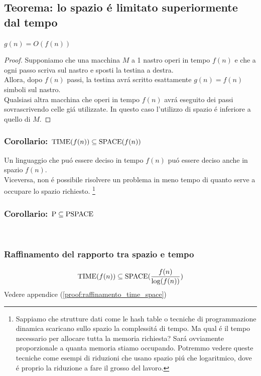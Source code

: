 \subsection{Teorema: lo spazio é limitato superiormente dal tempo}
\label{teorema:spazio_limitato_superiormente_dal_tempo}
{$g(n) = O(f(n))$}
\begin{proof}
Supponiamo che una macchina $M$ a 1 nastro operi in tempo $f(n)$ e che a ogni passo scriva sul nastro e sposti la testina a destra. \\
Allora, dopo $f(n)$ passi, la testina avrá scritto esattamente $g(n) = f(n)$ simboli sul nastro. \\
Qualsiasi altra macchina che operi in tempo $f(n)$ avrá eseguito dei passi sovrascrivendo celle giá utilizzate. In questo caso l'utilizzo di spazio é inferiore a quello di $M$.
\end{proof}

\subsubsection{Corollario: $\text{TIME}(f(n)) \subseteq \text{SPACE}(f(n))$}
Un linguaggio che puó essere deciso in tempo $f(n)$ puó essere deciso anche in spazio $f(n)$. \\
Viceversa, non é possibile risolvere un problema in meno tempo di quanto serve a occupare lo spazio richiesto.
\footnote{Sappiamo che strutture dati come le hash table o tecniche di programmazione dinamica 
scaricano sullo spazio la complessitá di tempo.
Ma qual é il tempo necessario per allocare tutta la memoria richiesta? Sará ovviamente proporzionale a quanta memoria stiamo occupando.
Potremmo vedere queste tecniche come esempi di riduzioni che usano spazio piú che logaritmico,
dove é proprio la riduzione a fare il grosso del lavoro.}

\subsubsection{Corollario: $\text{P} \subseteq \text{PSPACE}$}
\text{ }\\

\subsubsection*{Raffinamento del rapporto tra spazio e tempo} 
\label{raffinamento:time_space}
\[\text{TIME}(f(n)) \subseteq \text{SPACE}{ ( \frac{f(n)}{\log(f(n))} ) }\]
Vedere appendice (\ref{proof:raffinamento_time_space})
